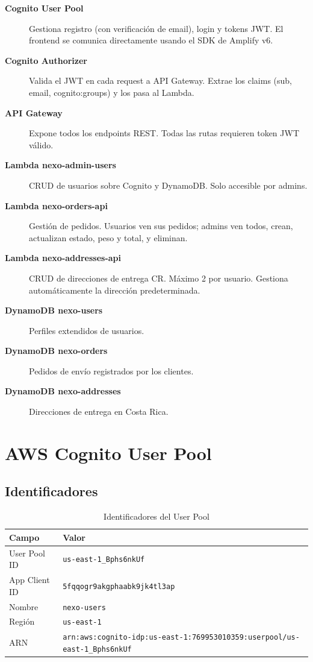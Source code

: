 \documentclass[12pt,a4paper]{article}
\begin{document}
\begin{description}
  \item[\textbf{Cognito User Pool}] Gestiona registro (con verificación de email),
    login y tokens JWT. El frontend se comunica directamente usando el SDK de Amplify v6.
  \item[\textbf{Cognito Authorizer}] Valida el JWT en cada request a API Gateway.
    Extrae los claims (sub, email, cognito:groups) y los pasa al Lambda.
  \item[\textbf{API Gateway}] Expone todos los endpoints REST. Todas las rutas
    requieren token JWT válido.
  \item[\textbf{Lambda nexo-admin-users}] CRUD de usuarios sobre Cognito y DynamoDB.
    Solo accesible por admins.
  \item[\textbf{Lambda nexo-orders-api}] Gestión de pedidos. Usuarios ven sus pedidos;
    admins ven todos, crean, actualizan estado, peso y total, y eliminan.
  \item[\textbf{Lambda nexo-addresses-api}] CRUD de direcciones de entrega CR. Máximo 2
    por usuario. Gestiona automáticamente la dirección predeterminada.
  \item[\textbf{DynamoDB nexo-users}] Perfiles extendidos de usuarios.
  \item[\textbf{DynamoDB nexo-orders}] Pedidos de envío registrados por los clientes.
  \item[\textbf{DynamoDB nexo-addresses}] Direcciones de entrega en Costa Rica.
\end{description}

\section{AWS Cognito User Pool}

\subsection{Identificadores}

\begin{table}[H]
\centering
\begin{tabular}{@{}ll@{}}
\toprule
\textbf{Campo} & \textbf{Valor} \\
\midrule
User Pool ID & \texttt{us-east-1\_Bphs6nkUf} \\
App Client ID & \texttt{5fqqogr9akgphaabk9jk4tl3ap} \\
Nombre & \texttt{nexo-users} \\
Región & \texttt{us-east-1} \\
ARN & \texttt{arn:aws:cognito-idp:us-east-1:769953010359:userpool/us-east-1\_Bphs6nkUf} \\
\bottomrule
\end{tabular}
\caption{Identificadores del User Pool}
\end{table}
\end{document}
